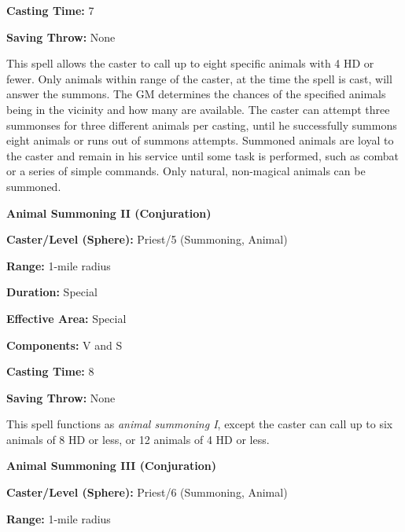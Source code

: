\begin{multicols}{2}
\begin{minipage}{\columnwidth}
\noindent \textbf{Casting Time:} 7

\noindent \textbf{Saving Throw:} None

\end{minipage}

This spell allows the caster to call up to eight specific animals with 4 HD or fewer.  Only animals within range of the caster, at the time the spell is cast, will answer the summons.  The GM determines the chances of the specified animals being in the vicinity and how many are available.  The caster can attempt three summonses for three different animals per casting, until he successfully summons eight animals or runs out of summons attempts.  Summoned animals are loyal to the caster and remain in his service until some task is performed, such as combat or a series of simple commands.  Only natural, non-magical animals can be summoned.

\vspace{1em}
 
\noindent
\begin{minipage}{\columnwidth}

\noindent \textbf{Animal Summoning II (Conjuration)}

\noindent \textbf{Caster/Level (Sphere):} Priest/5 (Summoning, Animal)

\noindent \textbf{Range:} 1-mile radius

\noindent \textbf{Duration:} Special

\noindent \textbf{Effective Area:} Special

\noindent \textbf{Components:} V and S

\noindent \textbf{Casting Time:} 8

\noindent \textbf{Saving Throw:} None

\end{minipage}

This spell functions as \textit{animal summoning I}, except the caster can call up to six animals of 8 HD or less, or 12 animals of 4 HD or less.

\vspace{1em}

\noindent
\begin{minipage}{\columnwidth}

\noindent \textbf{Animal Summoning III (Conjuration)}

\noindent \textbf{Caster/Level (Sphere):} Priest/6 (Summoning, Animal)

\noindent \textbf{Range:} 1-mile radius


\end{minipage}
\end{multicols}
